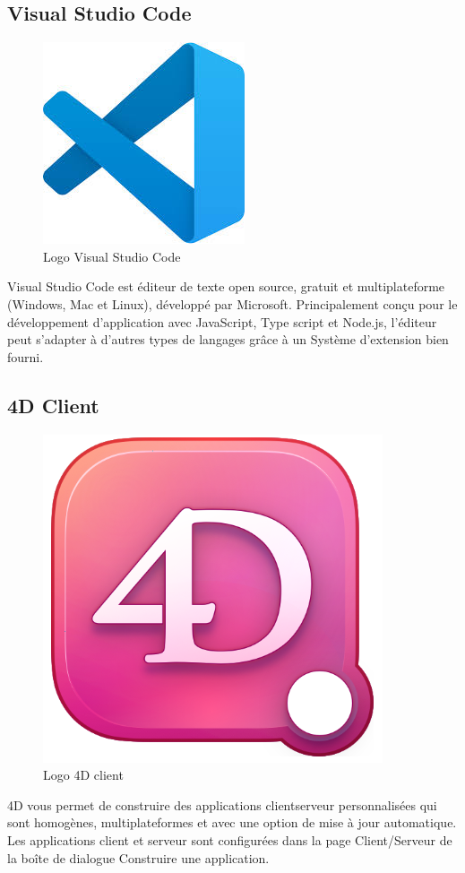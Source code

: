 \subsection{Visual Studio Code }

\begin{figure}[H]
    \centering
    \includegraphics[scale=0.25]{Logos/VS.jpg}
    \caption{Logo Visual Studio Code }
\end{figure}

Visual Studio Code est éditeur de texte open source, gratuit et multiplateforme (Windows, Mac et Linux), développé
par Microsoft. Principalement conçu pour le développement
d’application avec JavaScript, Type script et Node.js, l’éditeur peut s’adapter à d’autres types de langages grâce à un
Système d’extension bien fourni. \cite{VS}

\subsection{4D Client}

\begin{figure}[H]
    \centering
    \includegraphics[scale=0.5]{Logos/4dClient.PNG}
    \caption{Logo  4D client}
\end{figure}
4D vous permet de construire des applications clientserveur personnalisées qui sont homogènes, multiplateformes
et avec une option de mise à jour automatique. Les applications client et serveur sont configurées dans la page
Client/Serveur de la boîte de dialogue Construire une application.

